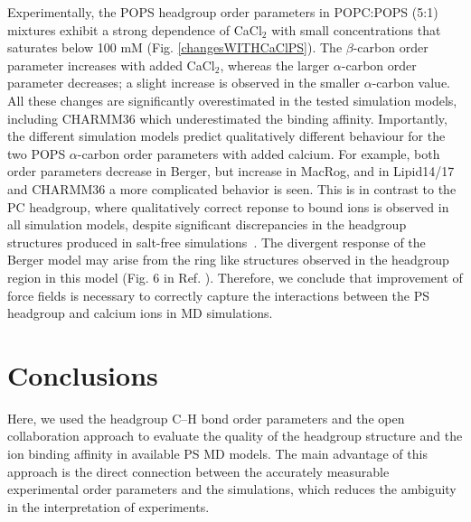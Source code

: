 \documentclass[aps,prl,superscriptaddress,twocolumn]{revtex4}
\begin{document}
Experimentally, the POPS headgroup order parameters in POPC:POPS (5:1) mixtures
exhibit a strong dependence of CaCl$_2$ with small concentrations that saturates below 100 mM (Fig. \ref{changesWITHCaClPS}).
The $\beta$-carbon order parameter increases with added CaCl$_2$,
whereas the larger $\alpha$-carbon order parameter decreases; a slight increase is observed in
the smaller $\alpha$-carbon value. All these changes are significantly overestimated in the
tested simulation models, including CHARMM36 which underestimated the binding affinity.
Importantly, the different simulation models predict qualitatively different behaviour
for the two POPS $\alpha$-carbon order parameters with added calcium.
For example, both order parameters decrease in Berger, but increase
in MacRog, and in Lipid14/17 and CHARMM36 a more complicated behavior is seen.
This is in contrast to the PC headgroup, where
qualitatively correct reponse to bound ions is observed
in all simulation models, despite significant discrepancies in the headgroup
structures produced in salt-free simulations~\cite{catte16}.
The divergent response of the Berger model may arise from the ring like structures
observed in the headgroup region in this model (Fig. 6 in Ref. ).
Therefore, we conclude that
improvement of force fields is necessary to correctly capture the interactions between the
PS headgroup and calcium ions in MD simulations.
\section{Conclusions}

Here, we used the headgroup C--H bond order parameters and the open collaboration approach to evaluate the quality
of the headgroup structure and the ion binding affinity 
in available PS MD models.
The main advantage of this approach is the direct connection
between the accurately measurable experimental order parameters and the simulations,
which reduces the ambiguity in the interpretation of experiments.
\end{document}
